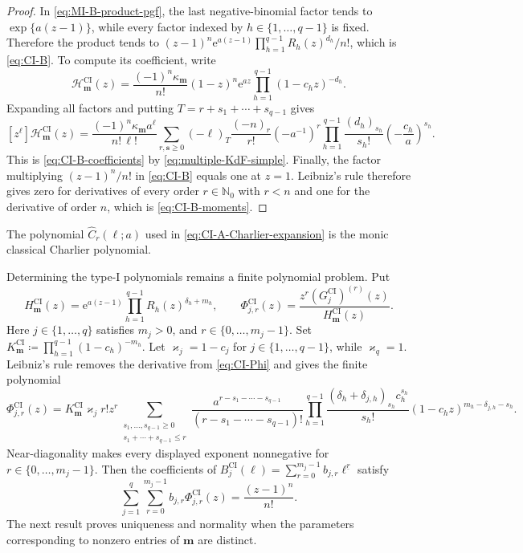 \documentclass[10pt]{amsart}
\newcommand{\Nzero}{\mathbb N_0}
\newcommand{\e}{\mathrm e}
\newcommand{\mm}{\boldsymbol m}
\newcommand{\fall}[2]{#1^{\underline{#2}}}
\theoremstyle{plain}
\theoremstyle{definition}
\theoremstyle{remark}
\begin{document}
\begin{proof}
In \eqref{eq:MI-B-product-pgf}, the last negative-binomial factor tends
to \(\exp\{a(z-1)\}\), while every factor indexed by
\(h\in\{1,\ldots,q-1\}\) is fixed.
Therefore the product tends to
\((z-1)^n\e^{a(z-1)}\prod_{h=1}^{q-1}R_h(z)^{d_h}/n!\), which is
\eqref{eq:CI-B}. To compute its coefficient, write
\[
 \mathcal H_{\mm}^{\mathrm{CI}}(z)
 =\frac{(-1)^n\kappa_{\mm}}{n!}
 (1-z)^n\e^{az}\prod_{h=1}^{q-1}(1-c_hz)^{-d_h}.
\]
Expanding all factors and putting
\(T=r+s_1+\cdots+s_{q-1}\) gives
\[
 [z^\ell]\mathcal H_{\mm}^{\mathrm{CI}}(z)
 =\frac{(-1)^n\kappa_{\mm}a^\ell}{n!\,\ell!}
 \sum_{r,\boldsymbol s\ge0}
 (-\ell)_T\frac{(-n)_r}{r!}(-a^{-1})^r
 \prod_{h=1}^{q-1}\frac{(d_h)_{s_h}}{s_h!}
 \left(-\frac{c_h}{a}\right)^{s_h}.
\]
This is \eqref{eq:CI-B-coefficients} by
\eqref{eq:multiple-KdF-simple}.  Finally, the factor multiplying
\((z-1)^n/n!\) in \eqref{eq:CI-B} equals one at \(z=1\).
Leibniz's rule therefore gives zero for derivatives of every order
\(r\in\Nzero\) with \(r<n\) and one for the derivative of order \(n\), which is
\eqref{eq:CI-B-moments}.
\end{proof}

The polynomial \(\widehat C_r(\ell;a)\) used in
\eqref{eq:CI-A-Charlier-expansion} is the monic classical Charlier
polynomial.

Determining the type-I polynomials remains a finite polynomial problem.
Put
\begin{equation}
 H_{\mm}^{\mathrm{CI}}(z)=
 \e^{a(z-1)}\prod_{h=1}^{q-1}R_h(z)^{\delta_h+m_h},
 \qquad
 \Phi_{j,r}^{\mathrm{CI}}(z)=
 \frac{z^r(G_j^{\mathrm{CI}})^{(r)}(z)}
 {H_{\mm}^{\mathrm{CI}}(z)}.
 \label{eq:CI-Phi}
\end{equation}
Here \(j\in\{1,\ldots,q\}\) satisfies \(m_j>0\), and
\(r\in\{0,\ldots,m_j-1\}\).
Set \(K_{\mm}^{\mathrm{CI}}\coloneq\prod_{h=1}^{q-1}(1-c_h)^{-m_h}\).
Let \(\varkappa_j=1-c_j\) for \(j\in\{1,\ldots,q-1\}\), while
\(\varkappa_q=1\). Leibniz's rule removes the derivative from
\eqref{eq:CI-Phi} and gives the finite polynomial
\begin{equation}
 \Phi_{j,r}^{\mathrm{CI}}(z)
 =K_{\mm}^{\mathrm{CI}}\varkappa_j r!z^r
 \sum_{\substack{s_1,\ldots,s_{q-1}\ge0\\
                  s_1+\cdots+s_{q-1}\le r}}
 \frac{a^{r-s_1-\cdots-s_{q-1}}}
 {(r-s_1-\cdots-s_{q-1})!}
 \prod_{h=1}^{q-1}
 \frac{(\delta_h+\delta_{j,h})_{s_h}c_h^{s_h}}{s_h!}
 (1-c_hz)^{m_h-\delta_{j,h}-s_h}.
 \label{eq:CI-Phi-finite}
\end{equation}
Near-diagonality makes every displayed exponent nonnegative for
\(r\in\{0,\ldots,m_j-1\}\).
Then the coefficients of
\(B_j^{\mathrm{CI}}(\ell)=\sum_{r=0}^{m_j-1}b_{j,r}\fall{\ell}{r}\)
satisfy
\begin{equation}
 \sum_{j=1}^q\sum_{r=0}^{m_j-1}
 b_{j,r}\Phi_{j,r}^{\mathrm{CI}}(z)=\frac{(z-1)^n}{n!}.
 \label{eq:CI-component-identity}
\end{equation}
The next result proves uniqueness and normality when the parameters
corresponding to nonzero entries of \(\mm\) are distinct.
\end{document}
